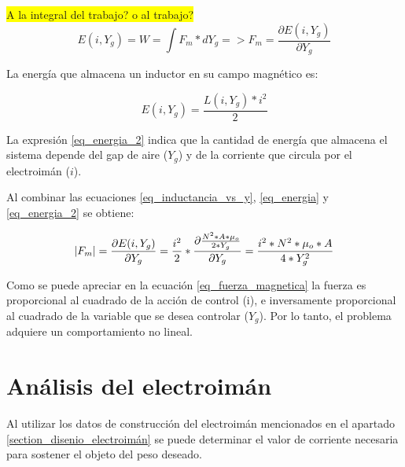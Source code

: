 \colorbox{yellow}{A la integral del trabajo? o al trabajo?}
\begin{equation}\label{eq_energia}
	E(i,Y_g)=W=\int{F_{m}*dY_g}=>F_{m}=\frac{\partial{E(i,Y_g)}}{\partial{Y_g}}
\end{equation}

\noindent La energía que almacena un inductor en su campo magnético es:

\begin{equation}\label{eq_energia_2}
	E(i,Y_g)=\frac{L(i,Y_g)*i^{2}}{2}
\end{equation}

\noindent La expresión \ref{eq_energia_2} indica que la cantidad de energía que almacena el sistema depende del gap de aire ($Y_{g}$) y de la corriente que circula por el electroimán ($i$). 

\noindent Al combinar las ecuaciones \ref{eq_inductancia_vs_y}, \ref{eq_energia} y \ref{eq_energia_2} se obtiene:

\begin{equation}\label{eq_fuerza_magnetica}
	\lvert F_{m}\rvert=\frac{\partial{E(i,Y_g)}}{\partial{Y_g}}=\frac{i^{2}}{2}*\frac{\partial{\frac{{N^{2}*A*\mu_{o}}}{2*Y_{g}}}}{\partial{Y_g}}=\frac{i^{2}*N^{2}*\mu_{o}*A}{4*Y_{g}^{2}}
\end{equation}

\noindent Como se puede apreciar en la ecuación \ref{eq_fuerza_magnetica} la fuerza es proporcional al cuadrado de la acción de control (i), e inversamente proporcional al cuadrado de la variable que se desea controlar ($Y_{g}$). Por lo tanto, el problema adquiere un comportamiento no lineal.


\section{Análisis del electroimán}

\noindent Al utilizar los datos de construcción del electroimán mencionados en el apartado \ref{section_disenio_electroimán} se puede determinar el valor de corriente necesaria para sostener el objeto del peso deseado.
	


